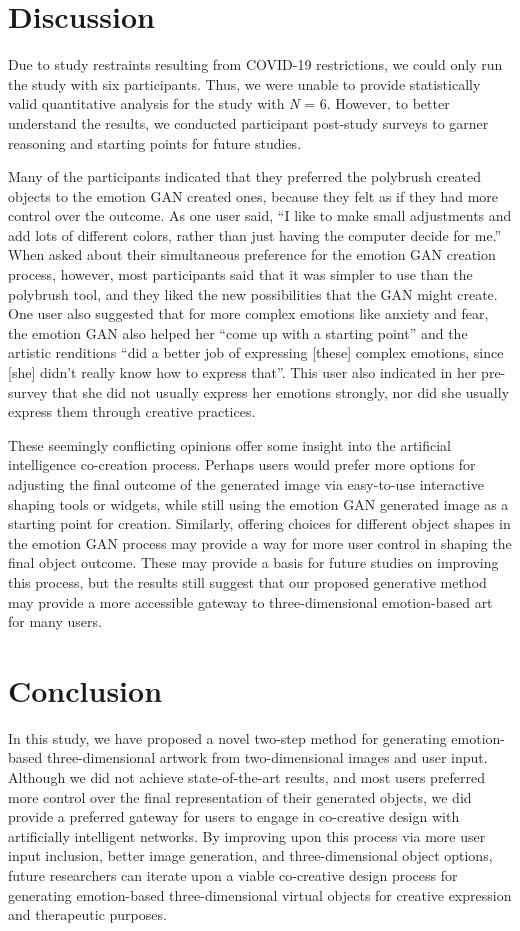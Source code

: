 \documentclass{sigchi}
\begin{document}
\section{Discussion}
Due to study restraints resulting from COVID-19 restrictions, we could only run the study with six participants. Thus, we were unable to provide statistically valid quantitative analysis for the study with \emph N = 6. However, to better understand the results, we conducted participant post-study surveys to garner reasoning and starting points for future studies. 

Many of the participants indicated that they preferred the polybrush created objects to the emotion GAN created ones, because they felt as if they had more control over the outcome. As one user said, “I like to make small adjustments and add lots of different colors, rather than just having the computer decide for me.” When asked about their simultaneous preference for the emotion GAN creation process, however, most participants said that it was simpler to use than the polybrush tool, and they liked the new possibilities that the GAN might create. One user also suggested that for more complex emotions like anxiety and fear, the emotion GAN also helped her “come up with a starting point” and the artistic renditions “did a better job of expressing [these] complex emotions, since [she] didn’t really know how to express that”. This user also indicated in her pre-survey that she did not usually express her emotions strongly, nor did she usually express them through creative practices.

These seemingly conflicting opinions offer some insight into the artificial intelligence co-creation process. Perhaps users would prefer more options for adjusting the final outcome of the generated image via easy-to-use interactive shaping tools or widgets, while still using the emotion GAN generated image as a starting point for creation. Similarly, offering choices for different object shapes in the emotion GAN process may provide a way for more user control in shaping the final object outcome. These may provide a basis for future studies on improving this process, but the results still suggest that our proposed generative method may provide a more accessible gateway to three-dimensional emotion-based art for many users. 

\section{Conclusion}
In this study, we have proposed a novel two-step method for generating emotion-based three-dimensional artwork from two-dimensional images and user input. Although we did not achieve state-of-the-art results, and most users preferred more control over the final representation of their generated objects, we did provide a preferred gateway for users to engage in co-creative design with artificially intelligent networks. By improving upon this process via more user input inclusion, better image generation, and three-dimensional object options, future researchers can iterate upon a viable co-creative design process for generating emotion-based three-dimensional virtual objects for creative expression and therapeutic purposes.
\end{document}
